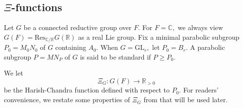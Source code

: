 \documentclass[12pt]{amsart}
\theoremstyle{remark}
\numberwithin{equation}{section}
\newcommand{\GL}{\mathrm{GL}}
\newcommand{\lto}{\longrightarrow}
\newcommand{\CC}{\mathbb{C}}
\newcommand{\RR}{\mathbb{R}}
\theoremstyle{definition}
\newenvironment{psmatrix}
  {\left(\begin{smallmatrix}}
  {\end{smallmatrix}\right)}
\numberwithin{equation}{subsection}
\begin{document}

\subsection{$\Xi$-functions}\label{ssec:HS}

Let $G$ be a connected reductive group over $F.$ For $F=\CC,$ we always view $G(F)=\mathrm{Res}_{\CC/\RR} G(\RR)$ as a real Lie group.  Fix a minimal parabolic subgroup $P_0=M_0N_0$ of $G$ containing $A_0$. When $G=\GL_{r},$ let $P_0=B_{r}.$ A parabolic subgroup $P=MN_P$ of $G$ is said to be standard if $P\ge P_0.$ 

We let 
$$
\Xi_G:G(F) \lto \RR_{>0}
$$
be the Harish-Chandra function defined with respect to $P_0$. %
For readers' convenience, we restate some properties of $\Xi_G$ from \cite[Proposition 1.5.1]{BP:Ast} that will be used later. 
\end{document}
